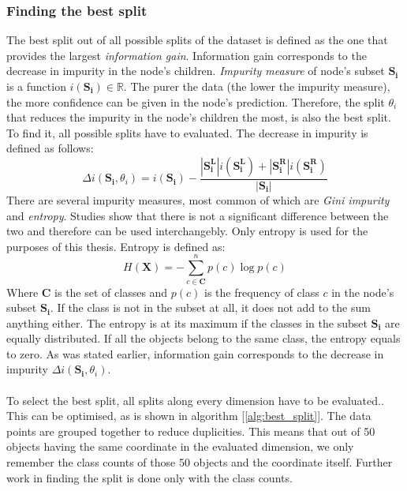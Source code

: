 \documentclass[11pt]{article}
\begin{document}
      \subsubsection{Finding the best split}
        \label{sec:split}
        The best split out of all possible splits of the dataset is defined as the one that provides the largest {\it information gain}. Information gain corresponds to the decrease in impurity in the node's children. {\it Impurity measure} of node's subset $\mathbf{S_i}$ is a function $i(\mathbf{S_i}) \in \mathbb{R}$. The purer the data (the lower the impurity measure), the more confidence can be given in the node's prediction. Therefore, the split $\theta_i$ that reduces the impurity in the node's children the most, is also the best split. To find it, all possible splits have to evaluated. The decrease in impurity is defined as follows:
        \begin{equation}
          \Delta i(\mathbf{S_i}, \theta_i) = i(\mathbf{S_i}) - \frac{|\mathbf{S_i^L}|i(\mathbf{S_i^L}) + |\mathbf{S_i^R}|i(\mathbf{S_i^R})}{|\mathbf{S_i}|}
        \end{equation}
        There are several impurity measures, most common of which are {\it Gini impurity} and {\it entropy}. Studies show that there is not a significant difference between the two and therefore can be used interchangebly.\cite{gini} Only entropy is used for the purposes of this thesis. Entropy is defined as:
        \begin{equation}
          H(\mathbf{X}) = - \sum_{c \in \mathbf{C}}^{n} p(c)\log{p(c)}
        \end{equation}
        Where $\mathbf{C}$ is the set of classes and $p(c)$ is the frequency of class $c$ in the node's subset $\mathbf{S_i}$.\cite{brabec} If the class is not in the subset at all, it does not add to the sum anything either. The entropy is at its maximum if the classes in the subset $\mathbf{S_i}$ are equally distributed. If all the objects belong to the same class, the entropy equals to zero. As was stated earlier, information gain corresponds to the decrease in impurity $\Delta i(\mathbf{S_i}, \theta_i)$.\cite{brabec}
        \\~\\
        To select the best split, all splits along every dimension have to be evaluated.\cite{brabec}. This can be optimised, as is shown in algorithm [\ref{alg:best_split}]. The data points are grouped together to reduce duplicities. This means that out of 50 objects having the same coordinate in the evaluated dimension, we only remember the class counts of those 50 objects and the coordinate itself. Further work in finding the split is done only with the class counts.\cite{brabec}
\end{document}
